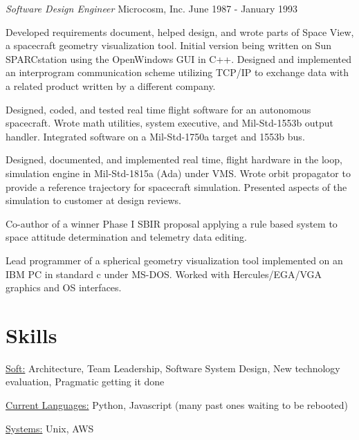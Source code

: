 \documentclass[margin]{res}
\begin{document}
\begin{resume}
                {\sl\large Software Design Engineer } Microcosm, Inc. \hfill June 1987 - January 1993

                Developed requirements document, helped design, and wrote
                parts of Space View, a spacecraft geometry visualization
                tool. Initial version being written on Sun SPARCstation
                using the OpenWindows GUI in C++. Designed and implemented
                an interprogram communication scheme utilizing TCP/IP
                to exchange data with a related product written by a
                different company.

                Designed, coded, and tested real time flight software for
                an autonomous spacecraft. Wrote math utilities, system
                executive, and Mil-Std-1553b output handler. Integrated
                software on a Mil-Std-1750a target and 1553b bus.

                Designed, documented, and implemented real time, flight
                hardware in the loop, simulation engine in Mil-Std-1815a
                (Ada) under VMS. Wrote orbit propagator to provide a
                reference trajectory for spacecraft simulation. Presented
                aspects of the simulation to customer at design reviews.

                Co-author of a winner Phase I SBIR proposal applying a
                rule based system to space attitude determination and
                telemetry data editing.

                Lead programmer of a spherical geometry visualization
                tool implemented on an IBM PC in standard c under
                MS-DOS. Worked with Hercules/EGA/VGA graphics and OS
                interfaces.

    \section{Skills}
        \underline{Soft:} Architecture, Team Leadership, Software System Design, New technology evaluation,
        Pragmatic getting it done

        \underline{Current Languages:} Python, Javascript (many past ones waiting to be rebooted)

        \underline{Systems:} Unix, AWS

\end{resume}
\end{document}
